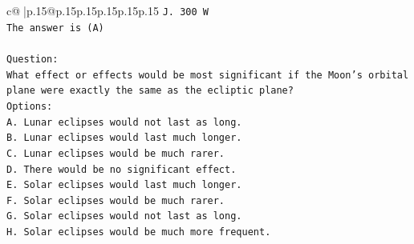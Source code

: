 \documentclass{article}
\begin{document}
{\begin{supertabular}{c@{$\;$}|p{.15\linewidth}@{}p{.15\linewidth}p{.15\linewidth}p{.15\linewidth}p{.15\linewidth}p{.15\linewidth}}
{{{\texttt{J. 300 W} \\
\texttt{The answer is (A)} \\
\\ 
\texttt{Question:} \\
\texttt{What effect or effects would be most significant if the Moon's orbital plane were exactly the same as the ecliptic plane?} \\
\texttt{Options:} \\
\texttt{A. Lunar eclipses would not last as long.} \\
\texttt{B. Lunar eclipses would last much longer.} \\
\texttt{C. Lunar eclipses would be much rarer.} \\
\texttt{D. There would be no significant effect.} \\
\texttt{E. Solar eclipses would last much longer.} \\
\texttt{F. Solar eclipses would be much rarer.} \\
\texttt{G. Solar eclipses would not last as long.} \\
\texttt{H. Solar eclipses would be much more frequent.} \\
            }
        }
    }
     \\ \\


\end{supertabular}}
\end{document}

